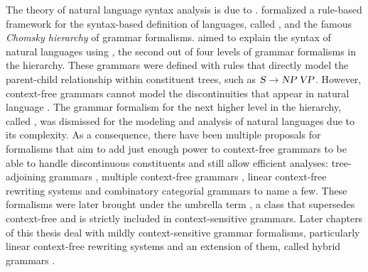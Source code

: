 \documentclass[../document.tex]{subfiles}
\begin{document}
    The theory of natural language syntax analysis is due to \citet{Cho56}.
     formalized a rule-based framework for the syntax-based definition of languages, called , and the famous \emph{Chomsky hierarchy} of grammar formalisms.
     aimed to explain the syntax of natural languages using , the second out of four levels of grammar formalisms in the hierarchy.
    These grammars were defined with rules that directly model the parent-child relationship within constituent trees, such as \(\textsc{\textsl{S}} \to \textsc{\textsl{NP}}\,\textsc{\textsl{VP}}\).
    However, context-free grammars cannot model the discontinuities that appear in natural language \citep{Shieber85}.
    The grammar formalism for the next higher level in the hierarchy, called , was dismissed for the modeling and analysis of natural languages due to its complexity.
    As a consequence, there have been multiple proposals for formalisms that aim to add just enough power to context-free grammars to be able to handle discontinuous constituents and still allow efficient analyses:
        tree-adjoining grammars \citep{JosLevTak75}, multiple context-free grammars \citep{SekMatFujKas91}, linear context-free rewriting systems \citep{VijWeiJos87} and combinatory categorial grammars \citep{Ste11} to name a few.
    These formalisms were later brought under the umbrella term , a class that supersedes context-free and is strictly included in context-sensitive grammars.
    Later chapters of this thesis deal with mildly context-sensitive grammar formalisms, particularly linear context-free rewriting systems and an extension of them, called hybrid grammars \citep{Ned14}.
\end{document}
